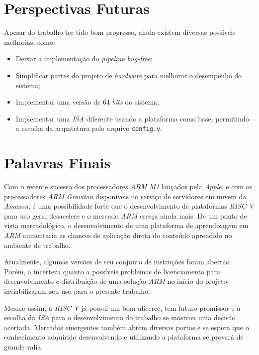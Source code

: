 \section{Perspectivas Futuras}
    { Apesar do trabalho ter tido bom progresso, ainda existem diversas possíveis
        melhorias, como:
    }
    \begin{itemize}
        \item Deixar a implementação do \textit{pipeline bug-free};
        \item Simplificar partes do projeto de \textit{hardware} para melhorar o desempenho do sistema;
        \item Implementar uma versão de 64 \textit{bits} do sistema;
        \item Implementar uma \textit{ISA} diferente usando a plataforma como base, permitindo a escolha da arquitetura pelo arquivo \texttt{config.v}.
    \end{itemize}


\section{Palavras Finais}

    { Com o recente sucesso dos processadores \textit{ARM M1} lançados pela
        \textit{Apple}, e com os processadores \textit{ARM Graviton} disponíveis
        no serviço de servidores em nuvem da \textit{Amazon}, é uma possibilidade
        forte que o desenvolvimento de plataformas \textit{RISC-V} para uso geral
        desacelere e o mercado \textit{ARM} cresça ainda mais. De um ponto de vista
        mercadológico, o desenvolvimento de uma plataforma de aprendizagem em
        \textit{ARM} aumentaria as chances de aplicação direta do conteúdo aprendido
        no ambiente de trabalho.
    }

    { Atualmente, algumas versões de seu conjunto de instruções foram abertas.
        Porém, a incerteza quanto a possíveis problemas de licenciamento para
        desenvolvimento e distribuição de uma solução \textit{ARM} no início do
        projeto inviabilizaram seu uso para o presente trabalho.
    }

    { Mesmo assim, a \textit{RISC-V} já possui um bom alicerce, tem futuro promissor
        e a escolha da \textit{ISA} para o desenvolvimento do trabalho se mostrou
        uma decisão acertada. Mercados emergentes também abrem diversas portas e
        se espera que o conhecimento adquirido desenvolvendo e utilizando a
        plataforma se provará de grande valia.
    }

